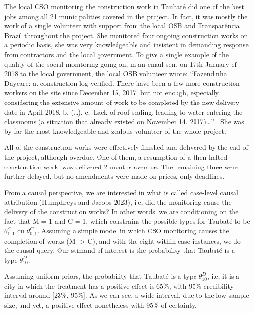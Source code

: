 \documentclass[]{AEA}
\begin{document}
The local CSO monitoring the construction work in Taubaté did one of the
best jobs among all 21 municipalities covered in the project. In fact,
it was mostly the work of a single volunteer with support from the local
OSB and Transparência Brazil throughout the project. She monitored four
ongoing construction works on a periodic basis, she was very
knowledgeable and insistent in demanding response from contractors and
the local government. To give a single example of the quality of the
social monitoring going on, in an email sent on 17th January of 2018 to
the local government, the local OSB volunteer wrote: ``Fazendinha
Daycare: a. construction log verified. There have been a few more
construction workers on the site since December 15, 2017, but not
enough, especially considering the extensive amount of work to be
completed by the new delivery date in April 2018. b. (\ldots). c.~Lack
of roof sealing, leading to water entering the classrooms (a situation
that already existed on November 14, 2017)\ldots{}'' . She was by far
the most knowledgeable and zealous volunteer of the whole project.

All of the construction works were effectively finished and delivered by
the end of the project, although overdue. One of them, a resumption of a
then halted construction work, was delivered 2 months overdue. The
remaining three were further delayed, but no amendments were made on
prices, only deadlines.

From a causal perspective, we are interested in what is called
case-level causal attribution (Humphreys and Jacobs 2023), i.e, did the
monitoring cause the delivery of the construction works? In other words,
we are conditioning on the fact that M = 1 and C = 1, which constrains
the possible types for Taubaté to be \(\theta^C_{1,1}\) ou
\(\theta^C_{0,1}\). Assuming a simple model in which CSO monitoring
causes the completion of works (M -\textgreater{} C), and with the eight
within-case instances, we do the causal query. Our stimand of interest
is the probability that Taubaté is a type \(\theta^D_{10}\).

Assuming uniform priors, the probability that Taubaté is a type
\(\theta^D_{10}\), i.e, it is a city in which the treatment has a
positive effect is 65\%, with 95\% credibility interval around {[}23\%,
95\%{]}. As we can see, a wide interval, due to the low sample size, and
yet, a positive effect nonetheless with 95\% of certainty.
\end{document}

